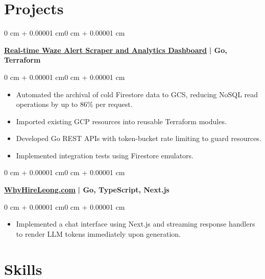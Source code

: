 \documentclass[10pt, letterpaper]{article}
\newenvironment{highlights}{
    \begin{itemize}[
        topsep=0.10 cm,
        parsep=0.10 cm,
        partopsep=0pt,
        itemsep=0pt,
        leftmargin=0 cm + 10pt
    ]
}{
    \end{itemize}
}
\newenvironment{onecolentry}{
    \begin{adjustwidth}{0 cm + 0.00001 cm}{0 cm + 0.00001 cm}
}{
    \end{adjustwidth}
}
\begin{document}
\section{Projects}
\vspace{0.1cm}

\begin{onecolentry}
    \href{https://github.com/Lllllllleong/wazePoliceScraperGCP}{\textbf{Real-time Waze Alert Scraper and Analytics Dashboard}}\textbf{ | Go, Terraform}
\end{onecolentry}


\vspace{0.1cm}

\begin{onecolentry}
    \begin{highlights}
        \item Automated the archival of cold Firestore data to GCS, reducing NoSQL read operations by up to 86\% per request.
        \item Imported existing GCP resources into reusable Terraform modules.
        \item Developed Go REST APIs with token-bucket rate limiting to guard resources.
        \item Implemented integration tests using Firestore emulators.

    \end{highlights}
\end{onecolentry}

\vspace{0.2cm}

\begin{onecolentry}
    \href{https://www.whyhireleong.com/}{\textbf{WhyHireLeong.com}}\textbf{ | Go, TypeScript, Next.js}
\end{onecolentry}

\vspace{0.1cm}

\begin{onecolentry}
    \begin{highlights}
        \item Implemented a chat interface using Next.js and streaming response handlers to render LLM tokens immediately upon generation.
    \end{highlights}
\end{onecolentry}

\section{Skills}
\vspace{0.1cm}
\end{document}
